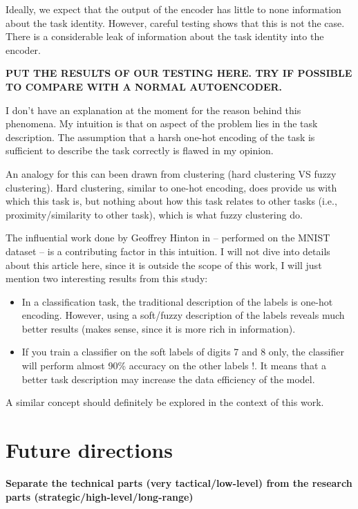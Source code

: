 Ideally, we expect that the output of the encoder has little to none information about the task identity. However, careful testing shows that this is not the case. There is a considerable leak of information about the task identity into the encoder.

\textbf{PUT THE RESULTS OF OUR TESTING HERE. TRY IF POSSIBLE TO COMPARE WITH A NORMAL AUTOENCODER.}

I don't have an explanation at the moment for the reason behind this phenomena. My intuition is that on aspect of the problem lies in the task description. The assumption that a harsh one-hot encoding of the task is sufficient to describe the task correctly is flawed in my opinion.

An analogy for this can been drawn from clustering (hard clustering VS fuzzy clustering). Hard clustering, similar to one-hot encoding, does provide us with which this task is, but nothing about how this task relates to other tasks (i.e., proximity/similarity to other task), which is what fuzzy clustering do.

The influential work done by Geoffrey Hinton in \cite{hinton2015distilling} -- performed on the MNIST dataset \cite{lecun-mnisthandwrittendigit-2010} -- is a contributing factor in this intuition. I will not dive into details about this article here, since it is outside the scope of this work, I will just mention two interesting results from this study:

\begin{itemize}
    \item In a classification task, the traditional description of the labels is one-hot encoding. However, using a soft/fuzzy description of the labels reveals much better results (makes sense, since it is more rich in information).
    \item If you train a classifier on the soft labels of digits 7 and 8 only, the classifier will perform almost 90\% accuracy on the other labels !. It means that a better task description may increase the data efficiency of the model.
\end{itemize}
A similar concept should definitely be explored in the context of this work.

\section{Future directions}\label{sec:future_direction}
\textbf{Separate the technical parts (very tactical/low-level) from the research parts (strategic/high-level/long-range)}

